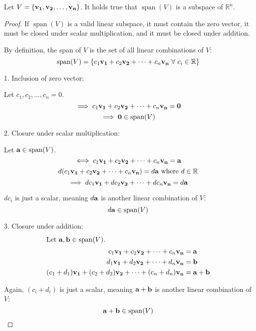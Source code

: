\documentclass[../main.tex]{subfiles}
\begin{document}
\begin{theorem}
	Let $V=\{ \mathbf{v_1}, \mathbf{v_2}, \ldots , \mathbf{v_n} \}$. It holds true that
	$\operatorname{span}(V)$ is a subspace of $\mathbb{R}^n$.
\end{theorem}

\begin{proof}
	If $\operatorname{span}(V)$ is a valid linear subspace, it must contain the zero vector,
	it must be closed under scalar multiplication, and it must be closed
	under addition.

	By definition, the span of $V$ is the set of all linear combinations of $V$:
	\begin{equation*}
		\operatorname{span}(V)=\{ c_1\mathbf{v_1} + c_2\mathbf{v_2} + \dots + c_n\mathbf{v_n}\ \forall\ c_i \in \mathbb{R} \}
	\end{equation*}

	1. Inclusion of zero vector:
	\begin{center}
		Let $c_1, c_2, \ldots , c_n=0$.
		\[\implies c_1\mathbf{v_1} + c_2\mathbf{v_2} + \dots + c_n\mathbf{v_n}=\mathbf{0}\]
		\[\implies \mathbf{0} \in \operatorname{span}(V)\]
	\end{center}

	2. Closure under scalar multiplication:
	\begin{center}
		Let $\mathbf{a} \in \operatorname{span}(V)$.
		\[\iff c_1\mathbf{v_1} + c_2\mathbf{v_2} + \dots + c_n\mathbf{v_n}=\mathbf{a}\]
		\[d(c_1\mathbf{v_1} + c_2\mathbf{v_2} + \dots + c_n\mathbf{v_n})=d\mathbf{a}\ \textnormal{where}\ d \in \mathbb{R}\]
		\[\implies dc_1\mathbf{v_1} + dc_2\mathbf{v_2} + \dots + dc_n\mathbf{v_n}=d\mathbf{a}\]
	\end{center}

	$dc_i$ is just a scalar, meaning $d\mathbf{a}$ is another
	linear combination of $V$:
	\[d\mathbf{a} \in \operatorname{span}(V)\]

	3. Closure under addition:
	\begin{align*}
		\intertext{Let $\mathbf{a}, \mathbf{b} \in \operatorname{span}(V)$.}
		c_1\mathbf{v_1} + c_2\mathbf{v_2} + \dots + c_n\mathbf{v_n}                   & = \mathbf{a}            \\
		d_1\mathbf{v_1} + d_2\mathbf{v_2} + \dots + d_n\mathbf{v_n}                   & = \mathbf{b}            \\
		(c_1+d_1)\mathbf{v_1} + (c_2+d_2)\mathbf{v_2} + \dots + (c_n+d_n)\mathbf{v_n} & = \mathbf{a} + \mathbf{b}
	\end{align*}

	Again, $(c_i+d_i)$ is just a scalar, meaning $\mathbf{a}+\mathbf{b}$ is another linear combination of $V$:
	\[\mathbf{a}+\mathbf{b} \in \operatorname{span}(V)\]
\end{proof}
\end{document}
